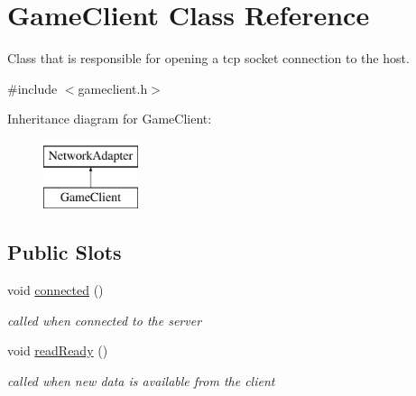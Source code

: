 \hypertarget{classGameClient}{\section{\-Game\-Client \-Class \-Reference}
\label{classGameClient}
}


\-Class that is responsible for opening a tcp socket connection to the host.  




{\ttfamily \#include $<$gameclient.\-h$>$}

\-Inheritance diagram for \-Game\-Client\-:\begin{figure}[H]
\begin{center}
\leavevmode
\includegraphics[height=2.000000cm]{classGameClient}
\end{center}
\end{figure}
\subsection*{\-Public \-Slots}
\begin{DoxyCompactItemize}
\item 
\hypertarget{classGameClient_aac63bd682b0cfde980b042bf8145e883}{void \hyperlink{classGameClient_aac63bd682b0cfde980b042bf8145e883}{connected} ()}\label{classGameClient_aac63bd682b0cfde980b042bf8145e883}

\begin{DoxyCompactList}\small\item\em called when connected to the server \end{DoxyCompactList}\item 
\hypertarget{classGameClient_a5457bdb6b9a17067bbb67a2498ee395d}{void \hyperlink{classGameClient_a5457bdb6b9a17067bbb67a2498ee395d}{read\-Ready} ()}\label{classGameClient_a5457bdb6b9a17067bbb67a2498ee395d}

\begin{DoxyCompactList}\small\item\em called when new data is available from the client \end{DoxyCompactList}\end{DoxyCompactItemize}
